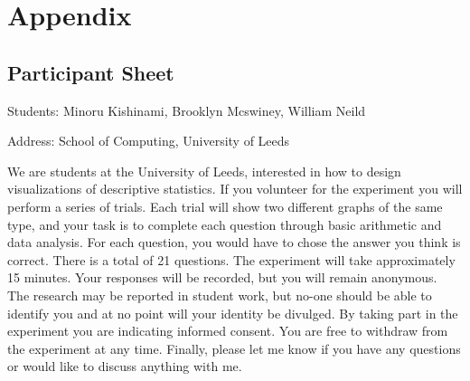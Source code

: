 \section{Appendix}
\subsection{Participant Sheet}
\begin{flushleft}
Students: Minoru Kishinami, Brooklyn Mcswiney, William Neild

Address: School of Computing, University of Leeds
\medskip
 
\quad We are students at the University of Leeds, interested in how to design visualizations of descriptive statistics. If you volunteer for the experiment you will perform a series of trials. Each trial will show two different graphs of the same type, and your task is to complete each question through basic arithmetic and data analysis. For each question, you would have to chose the answer you think is correct. There is a total of 21 questions.
The experiment will take approximately 15 minutes. Your responses will be recorded, but you will remain anonymous. The research may be reported in student work, but no-one should be able to identify you and at no point will your identity be divulged.
By taking part in the experiment you are indicating informed consent. You are free to withdraw from the experiment at any time. 
Finally, please let me know if you have any questions or would like to discuss anything with me.
\end{flushleft}
